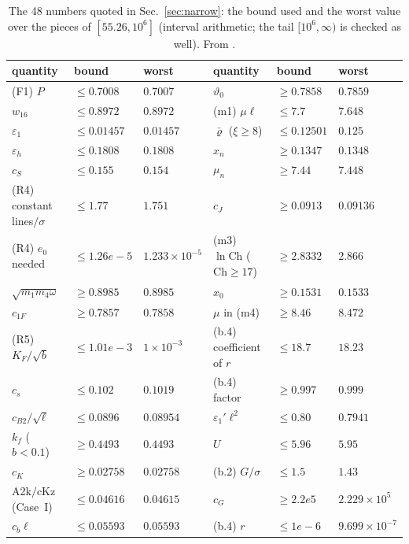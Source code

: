 \begin{table}
\caption{The 48 numbers quoted in Sec.~\ref{sec:narrow}: the bound used and the worst value over the pieces of $[55.26,10^6]$ (interval arithmetic; the tail $[10^6,\infty)$ is checked as well). From .}
\label{tab:quoted48}
\begin{ruledtabular}
\small
\begin{tabular}{p{}p{}p{}p{}p{}p{}}
quantity & bound & worst & quantity & bound & worst\\ \hline
(F1) $P$ & $\le 0.7008$ & $0.7007$ & $\vartheta_0$ & $\ge 0.7858$ & $0.7859$\\
$w_{16}$ & $\le 0.8972$ & $0.8972$ & (m1) $\mu\ell$ & $\le 7.7$ & $7.648$\\
$\varepsilon_1$ & $\le 0.01457$ & $0.01457$ & $\bar\varrho$ ($\xi\ge8$) & $\le 0.12501$ & $0.125$\\
$\varepsilon_h$ & $\le 0.1808$ & $0.1808$ & $x_n$ & $\ge 0.1347$ & $0.1348$\\
$c_S$ & $\le 0.155$ & $0.154$ & $\mu_n$ & $\ge 7.44$ & $7.448$\\
(R4) constant lines$/\sigma$ & $\le 1.77$ & $1.751$ & $c_J$ & $\ge 0.0913$ & $0.09136$\\
(R4) $e_0$ needed & $\le 1.26e-5$ & $1.233\times10^{-5}$ & (m3) $\ln\mathrm{Ch}$ ($\mathrm{Ch}\ge17$) & $\ge 2.8332$ & $2.866$\\
$\sqrt{m_1m_4\omega}$ & $\ge 0.8985$ & $0.8985$ & $x_0$ & $\ge 0.1531$ & $0.1533$\\
$c_{1F}$ & $\ge 0.7857$ & $0.7858$ & $\mu$ in (m4) & $\ge 8.46$ & $8.472$\\
(R5) $K_F/\sqrt b$ & $\le 1.01e-3$ & $1\times10^{-3}$ & (b.4) coefficient of $r$ & $\le 18.7$ & $18.23$\\
$c_s$ & $\le 0.102$ & $0.1019$ & (b.4) factor & $\ge 0.997$ & $0.999$\\
$c_{B2}/\sqrt\ell$ & $\le 0.0896$ & $0.08954$ & $\varepsilon_1'\ell^2$ & $\le 0.80$ & $0.7941$\\
$k_f$ ($b<0.1$) & $\ge 0.4493$ & $0.4493$ & $U$ & $\le 5.96$ & $5.95$\\
$c_K$ & $\ge 0.02758$ & $0.02758$ & (b.2) $G/\sigma$ & $\le 1.5$ & $1.43$\\
A2k$/$cKz (Case~I) & $\le 0.04616$ & $0.04615$ & $c_G$ & $\ge 2.2e5$ & $2.229\times10^{5}$\\
$c_b\ell$ & $\le 0.05593$ & $0.05593$ & (b.4) $r$ & $\le 1e-6$ & $9.699\times10^{-7}$\\

\end{tabular}
\end{ruledtabular}
\end{table}
